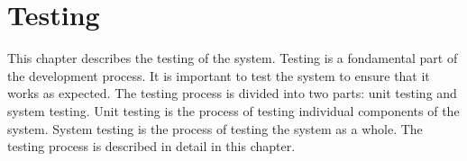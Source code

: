 \chapter{Testing}

This chapter describes the testing of the system. Testing is a fondamental part of the development process. It is important to test the system to ensure that it works as expected. The testing process is divided into two parts: unit testing and system testing. Unit testing is the process of testing individual components of the system. System testing is the process of testing the system as a whole. The testing process is described in detail in this chapter.



